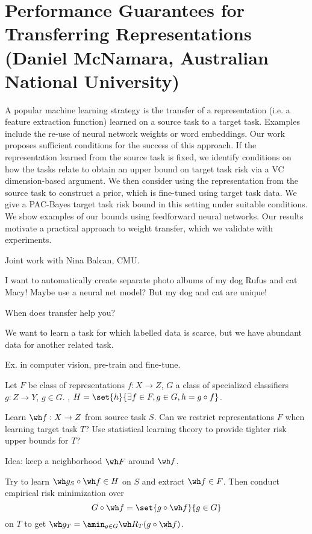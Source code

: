 \section{Performance Guarantees for Transferring Representations (Daniel McNamara, Australian National University)}

A popular machine learning strategy is the transfer of a representation (i.e. a feature extraction function) learned on a source task to a target task. Examples include the re-use of neural network weights or word embeddings. Our work proposes sufficient conditions for the success of this approach. If the representation learned from the source task is fixed, we identify conditions on how the tasks relate to obtain an upper bound on target task risk via a VC dimension-based argument. We then consider using the representation from the source task to construct a prior, which is fine-tuned using target task data. We give a PAC-Bayes target task risk bound in this setting under suitable conditions. We show examples of our bounds using feedforward neural networks. Our results motivate a practical approach to weight transfer, which we validate with experiments.

Joint work with Nina Balcan, CMU.


I want to automatically create separate photo albums of my dog Rufus and cat Macy! Maybe use a neural net model? But my dog and cat are unique!

When does transfer help you?

We want to learn a task for which labelled data is scarce, but we have abundant data for another related task. 

Ex. in computer vision, pre-train and fine-tune.

Let $F$ be class of representations $f:X\to Z$, $G$ a class of specialized classifiers $g:Z\to Y$, $g\in G$. , $H=\set{h}{\exists f\in F, g\in G, h=g\circ f}$. 

Learn $\wh f:X\to Z$ from source task $S$. Can we restrict representations $F$ when learning target task $T$?  Use statistical learning theory to provide tighter risk upper bounds for $T$? 

Idea: keep a neighborhood $\wh F$ around $\wh f$.


Try to learn $\wh g_S \circ \wh f\in H$ on $S$ and extract $\wh f\in F$. Then conduct empirical risk minimization over 
$$
G\circ \wh f = \set{g\circ \wh f}{g\in G}
$$
on $T$ to get $\wh g_T = \amin_{g\in G} \wh R_T(g\circ \wh f)$.


